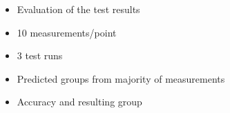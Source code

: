 \begin{itemize}
		\item Evaluation of the test results
		\item 10 measurements/point
		\item 3 test runs
		\item Predicted groups from majority of measurements
		\item Accuracy and resulting group
	\end{itemize}
